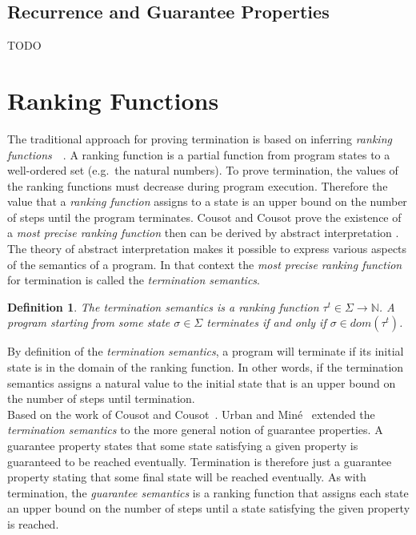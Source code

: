 \documentclass[11pt,a4paper,titlepage]{article}
\newtheorem{definition}{Definition}[section]
\begin{document}
\subsection{Recurrence and Guarantee Properties}
TODO


\section{Ranking Functions}\label{sec:ranking_functions}

The traditional approach for proving termination is based on inferring \textit{ranking functions}~\cite{Touring49}~\cite{Floyd67}.
A ranking function is a partial function from program states to a well-ordered set (e.g.\ the natural numbers). 
To prove termination, the values of the ranking functions must decrease during program execution. Therefore the value that a \textit{ranking function} assigns to a state is an upper bound on the number of steps until the program terminates.
Cousot and Cousot prove the existence of a \textit{most precise ranking function} then can be derived 
by abstract interpretation \cite{CousotCousot-POPL12}. The theory of abstract interpretation makes it possible to express 
various aspects of the semantics of a program. In that context the \textit{most precise ranking function} for termination is called
the \textit{termination semantics}.

\begin{definition}
    The \textit{termination semantics} is a ranking function 
    $\tau^{t} \in \Sigma \rightarrow \mathbb{N}$.
    A program starting from some state $\sigma \in \Sigma$ terminates if and only if $\sigma \in dom(\tau^{t})$.
\end{definition}

By definition of the \textit{termination semantics}, a program will terminate if its initial state is in the domain of
the ranking function. In other words, if the termination semantics assigns a natural value to the initial state that
is an upper bound on the number of steps until termination.\\


Based on the work of Cousot and Cousot~\cite{CousotCousot-POPL12}. Urban and Miné~\cite{UrbanM-VMCAI15} extended the 
\textit{termination semantics} to the more general notion of guarantee properties. A guarantee property states that
some state satisfying a given property is guaranteed to be reached eventually. Termination is therefore just a 
guarantee property stating that some final state will be reached eventually. As with termination, 
the \textit{guarantee semantics} is a ranking function that assigns each state an upper bound on the number of steps
until a state satisfying the given property is reached.
\end{document}
